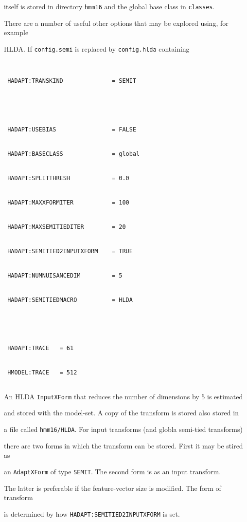 itself is stored in directory {\tt hmm16} and the global base class in {\tt classes}.





There are a number of useful other options that may be explored using, for example


HLDA. If \texttt{config.semi} is replaced by \texttt{config.hlda} containing


\begin{verbatim}


 HADAPT:TRANSKIND              = SEMIT





 HADAPT:USEBIAS                = FALSE


 HADAPT:BASECLASS              = global


 HADAPT:SPLITTHRESH            = 0.0


 HADAPT:MAXXFORMITER           = 100


 HADAPT:MAXSEMITIEDITER        = 20


 HADAPT:SEMITIED2INPUTXFORM    = TRUE


 HADAPT:NUMNUISANCEDIM         = 5


 HADAPT:SEMITIEDMACRO          = HLDA





 HADAPT:TRACE   = 61


 HMODEL:TRACE   = 512


\end{verbatim}


An HLDA \texttt{InputXForm} that reduces the number of dimensions by 5 is estimated


and stored with the model-set. A copy of the transform is stored also stored in 


a file called \texttt{hmm16/HLDA}. For input transforms (and globla semi-tied transforms)


there are two forms in which the transform can be stored. First it may be stired as


an \texttt{AdaptXForm} of type \texttt{SEMIT}. The second form is as an input transform.


The latter is preferable if the feature-vector size is modified. The form of transform


is determined by how \texttt{HADAPT:SEMITIED2INPUTXFORM} is set. 





